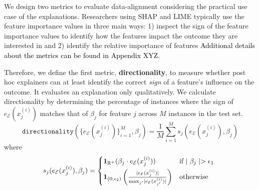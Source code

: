 \documentclass[mnsc,blindrev]{informs3}
\newcommand{\mE}{\mathcal{E}}
\begin{document}
         
          We design two metrics to evaluate data-alignment  considering the practical use case of the explanations. Researchers using SHAP and LIME typically use the feature importance values in three main ways: 1) inspect the sign of the feature importance values to identify how the features impact the outcome they are interested in and %
         2)  identify the relative importance of features %
    \textcolor{black}{Additional details about the metrics can be found in Appendix XYZ.}

    Therefore, we define the first metric, \textbf{directionality}, to measure whether post hoc explainers can at least identify the correct \textit{sign} of a feature's influence on the outcome. It evaluates an explanation only qualitatively. We calculate directionality by determining the percentage of instances where the sign of $e_\mE(x^{(i)}_j)$ matches that of $\beta_j$ for feature $j$ across $M$ instances in the test set. %
    \begin{equation}
        \label{eq:acc}
        \texttt{directionality}(\{e_\mE(x^{(i)}_j)\}_{i=1}^M,\beta_j) = \frac{1}{M} \sum_{i=1}^M s_j( e_\mE(x^{(i)}_j),\beta_j)
    \end{equation}
    where 
    \begin{equation*}
        s_j(e_\mE(x^{(i)}_j),\beta_j) = \begin{cases*}
                    \mathbf{1}_{\mathbb{R}^+}(\beta_j \cdot e_\mE(x^{(i)}_j)) & if  $\mid \beta_j\mid > \epsilon_1$  \\
                     \mathbf{1}_{(0,\epsilon_2)}\left(\frac{\mid e_\mE(x^{(i)}_j)\mid }{\max_{j'} \mid e_\mE(x^{(i)}_{j'})\mid}\right) & otherwise
                 \end{cases*}
    \end{equation*}
\end{document}
